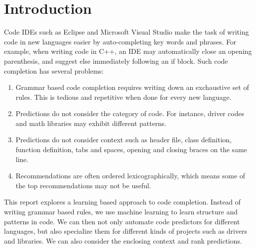 \section{Introduction}
\label{sec:intro}

\noindent
Code IDEs such as Eclipse and Microsoft Visual Studio make the task of writing
code in new languages easier by auto-completing key words and phrases.
For example, when writing code in C++, an IDE may automatically close an
opening parenthesis, and suggest else immediately following an if block.
Such code completion has several problems:
\begin{enumerate}[topsep=0pt,itemsep=-1ex,partopsep=1ex,parsep=1ex]
  \item Grammar based code completion requires writing down an exchaustive set
    of rules. This is tedious and repetitive when done for every new language.
  \item Predictions do not consider the category of code. For instance, driver
    codes and math libraries may exhibit different patterns.
  \item Predictions do not consider context such as header file, class
    definition, function definition, tabs and spaces, opening and closing
    braces on the same line.
  \item Recommendations are often ordered lexicographically, which means some
    of the top recommendations may not be useful.
\end{enumerate}

\noindent
This report explores a learning based approach to code completion. Instead of
writing grammar based rules, we use machine learning to learn structure and
patterns in code. We can then not only automate code predictors for different
languages, but also specialize them for different kinds of projects such as
drivers and libraries. We can also consider the enclosing context and rank
predictions.

